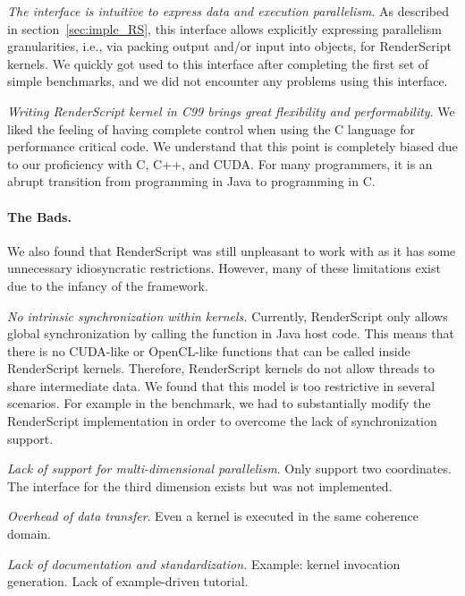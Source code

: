 \textit{The  interface is intuitive to express data and
execution parallelism}. As described in section~\ref{sec:imple_RS}, this
 interface allows explicitly expressing parallelism
granularities, i.e., via packing output and/or input into  objects,
for RenderScript kernels.  We quickly got used to this interface
after completing the first set of simple benchmarks, and we did not encounter
any problems using this interface.

\textit{Writing RenderScript kernel in C99 brings great flexibility and
performability}. We
liked the feeling of having complete control when using
the C language for performance critical code. We understand that this point is
completely biased due to our proficiency with C, C++, and CUDA. For many
programmers, it is an abrupt transition from programming in Java to programming
in C.


\paragraph{The Bads.} We also found that RenderScript was still unpleasant to work with as it has some unnecessary idiosyncratic restrictions. However, many of these limitations exist due to the
infancy of the framework.

\textit{No intrinsic synchronization within kernels.} Currently, RenderScript
only allows global synchronization by calling the  function in
Java host code. This means that there is no CUDA-like  or
OpenCL-like  functions that can be called inside RenderScript
kernels. Therefore, RenderScript kernels do not allow threads to share
intermediate data. We found that this model is too restrictive in several
scenarios. For example in the  benchmark, we had to substantially
modify the RenderScript  implementation in order
to overcome the lack of
synchronization support.

\textit{Lack of support for multi-dimensional parallelism}. Only support two
coordinates. The interface for the third dimension exists but was not
implemented.

\textit{Overhead of data transfer}. Even a kernel is executed in the same
coherence domain.

\textit{Lack of documentation and standardization.} Example: kernel invocation
generation. Lack of example-driven tutorial.


